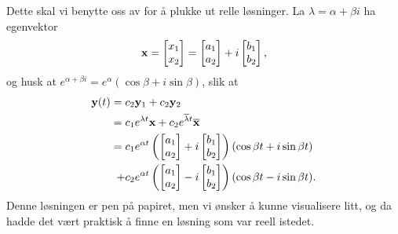 Dette skal vi benytte oss av for å plukke ut relle løsninger. La $\lambda=\alpha+\beta i$ ha egenvektor 
\[\mathbf{x}=\begin{bmatrix}  x_{1} \\ x_{2}\end{bmatrix}=\begin{bmatrix}  a_{1} \\ a_{2}\end{bmatrix}+i\begin{bmatrix}  b_{1} \\ b_{2}\end{bmatrix},\]
og husk at $e^{\alpha+\beta i}=e^{\alpha}(\cos \beta +i\sin{\beta})$, slik at
\begin{align*}
\mathbf{y}(t)=\;&c_2\mathbf{y}_1 +c_2\mathbf{y}_2 \\ =\;&c_1e^{\lambda t}\mathbf{x} +c_2e^{\overline{\lambda} t}\overline{\mathbf{x}} \\ =\;&c_1e^{\alpha t}\left(\begin{bmatrix}  a_{1} \\ a_{2}\end{bmatrix}+i\begin{bmatrix}  b_{1} \\ b_{2}\end{bmatrix}\right)(\cos{\beta t}+i\sin{\beta t})\\+&c_2e^{\alpha t}\left(\begin{bmatrix}  a_{1} \\ a_{2}\end{bmatrix}-i\begin{bmatrix}  b_{1} \\ b_{2}\end{bmatrix}\right) (\cos{\beta t}-i\sin{\beta t}).
\end{align*}
Denne løsningen er pen på papiret, men vi ønsker å kunne visualisere litt, og da hadde det vært praktisk å finne en løsning som var reell istedet. 

